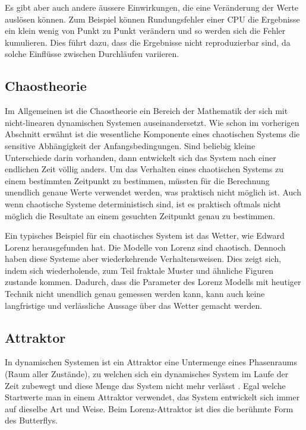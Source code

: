 Es gibt aber auch andere äussere Einwirkungen, die eine Veränderung der Werte auslösen können. Zum Beispiel können Rundungsfehler einer CPU die Ergebnisse ein klein wenig von Punkt zu Punkt verändern und so werden sich die Fehler kumulieren. Dies führt dazu, dass die Ergebnisse nicht reproduzierbar sind, da solche Einflüsse zwischen Durchläufen variieren.
%

\subsection{Chaostheorie}
Im Allgemeinen ist die Chaostheorie ein Bereich der Mathematik der sich mit nicht-linearen dynamischen Systemen auseinandersetzt. Wie schon im vorherigen Abschnitt erwähnt ist die wesentliche Komponente eines chaotischen Systems die sensitive Abhängigkeit der Anfangsbedingungen. Sind beliebig kleine Unterschiede darin vorhanden, dann entwickelt sich das System nach einer endlichen Zeit völlig anders. Um das Verhalten eines chaotischen Systems zu einem bestimmten Zeitpunkt zu bestimmen, müssten für die Berechnung unendlich genaue Werte verwendet werden, was praktisch nicht möglich ist. Auch wenn chaotische Systeme deterministisch sind, ist es praktisch oftmals nicht möglich die Resultate an einem gesuchten Zeitpunkt genau zu bestimmen. 
%


Ein typisches Beispiel für ein chaotisches System ist das Wetter, wie Edward Lorenz herausgefunden hat. Die Modelle von Lorenz sind chaotisch. Dennoch haben diese Systeme aber	 wiederkehrende Verhaltensweisen. Dies zeigt sich, indem sich wiederholende, zum Teil fraktale Muster und ähnliche Figuren zustande kommen. Dadurch, dass die Parameter des Lorenz Modells mit heutiger Technik nicht unendlich genau gemessen werden kann, kann auch keine langfristige und verlässliche Aussage über das Wetter gemacht werden. 

\subsection{Attraktor}
In dynamischen Systemen ist ein Attraktor eine Untermenge eines Phasenraums (Raum aller Zustände), zu welchen sich ein dynamisches System im Laufe der Zeit zubewegt und diese Menge das System nicht mehr verlässt \cite{wikiattraktor}. 
Egal welche Startwerte man in einem Attraktor verwendet, das System entwickelt sich immer auf dieselbe Art und Weise. Beim Lorenz-Attraktor ist dies die berühmte Form des Butterflys. 

